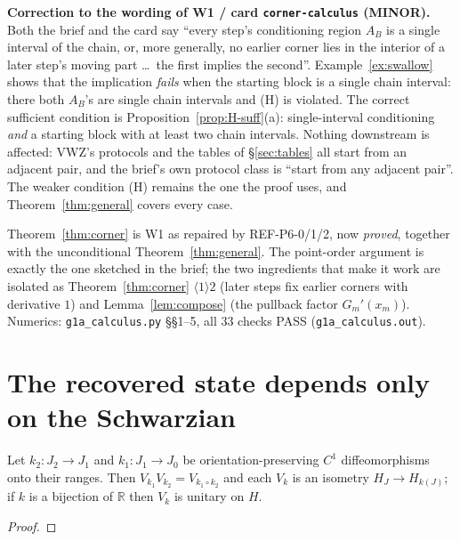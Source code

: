 \documentclass[11pt]{article}
\theoremstyle{definition}\newtheorem{example}[theorem]{Example}
\begin{document}
\begin{verdictgap}
\textbf{Correction to the wording of W1 / card \texttt{corner-calculus} (MINOR).}  Both the brief
and the card say ``every step's conditioning region $A_B$ is a single interval of the chain, or,
more generally, no earlier corner lies in the interior of a later step's moving part
\dots\ the first implies the second''.  Example~\ref{ex:swallow} shows that the implication
\emph{fails} when the starting block is a single chain interval: there both $A_B$'s are single
chain intervals and (H) is violated.  The correct sufficient condition is
Proposition~\ref{prop:H-suff}(a): single-interval conditioning \emph{and} a starting block with at
least two chain intervals.  Nothing downstream is affected: VWZ's protocols and the tables of
\S\ref{sec:tables} all start from an adjacent pair, and the brief's own protocol class is
``start from any adjacent pair''.  The weaker condition (H) remains the one the proof uses, and
Theorem~\ref{thm:general} covers every case.
\end{verdictgap}

\begin{verdictok}
Theorem~\ref{thm:corner} is W1 as repaired by REF-P6-0/1/2, now \emph{proved}, together with the
unconditional Theorem~\ref{thm:general}.  The point-order argument is exactly the one sketched in
the brief; the two ingredients that make it work are isolated as
Theorem~\ref{thm:corner} $\langle1\rangle2$ (later steps fix earlier corners with derivative $1$)
and Lemma~\ref{lem:compose} (the pullback factor $G_m'(x_m)$).  Numerics:
\texttt{g1a\_calculus.py} \S\S1--5, all $33$ checks PASS (\texttt{g1a\_calculus.out}).
\end{verdictok}

\section{The recovered state depends only on the Schwarzian}\label{sec:state}

\begin{lemma}\label{lem:comp-W}
Let $k_2:J_2\to J_1$ and $k_1:J_1\to J_0$ be orientation-preserving $C^1$ diffeomorphisms onto
their ranges.  Then $V_{k_1}V_{k_2}=V_{k_1\circ k_2}$ and each $V_k$ is an isometry
$H_J\to H_{k(J)}$; if $k$ is a bijection of $\mathbb R$ then $V_k$ is unitary on $H$.
\end{lemma}
\begin{proof}
\end{proof}
\end{document}
